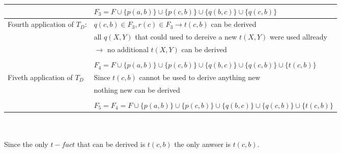 \begin{exercise}{8}
\begin{subexercise}
\begin{enumerate}
\begin{tabular}{l l}
                              & $F_3 = F \cup \{p(a,b)\} \cup \{p(c,b)\} \cup
                              \{q(b,c)\} \cup \{q(c,b)\}$ \\ \hline
            Fourth application of $T_D$: & $q(c,b)\in F_3, r(c)\in F_3
                          \rightarrow t(c,b)$ can be derived \\
                          & all $q(X,Y)$ that could used to dereive a new
                          $t(X,Y)$ were used allready\\
                          &$\rightarrow$ no additional $t(X,Y)$ can be derived\\
                          \\
                          & $F_4 = F \cup \{p(a,b)\} \cup \{p(c,b)\} \cup
                          \{q(b,c)\} \cup \{q(c,b)\} \cup \{t(c,b)\}$ \\ \hline

            Fiveth application of $T_D$ & Since $t(c,b)$ cannot be used to
                        derive anything new\\ & nothing new can be derived \\ \\
                          & $F_5 = F_4 = F \cup \{p(a,b)\} \cup \{p(c,b)\} \cup
                          \{q(b,c)\} \cup \{q(c,b)\} \cup \{t(c,b)\}$ \\ \hline
        \end{tabular}
        \\ \\ Since the only $t-fact$ that can be derived is $t(c,b)$ the only anwser
        is $t(c,b)$.
    \end{enumerate}
  \end{subexercise}

\end{exercise}
